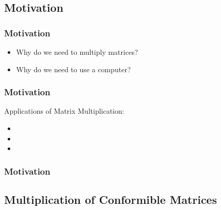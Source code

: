 \documentclass[fleqn]{beamer} %
\newcommand{\sectionIIsubsectionItitle}{Motivation}
\newcommand{\sectionIIsubsectionIItitle}{Multiplication of Conformible Matrices}
\begin{document}
		\subsection{\sectionIIsubsectionItitle}\label{sectionIIsubsectionI}

			\begin{frame}[label=sectionIIsubsectionI]
				\frametitle{\sectionIIsubsectionItitle}
				\bigskip

				\begin{itemize}

					\item Why do we need to multiply matrices? \vspace{20mm}\\
	
					\item Why do we need to use a computer?
	
	  			\end{itemize}
  
				\btVFill
			\end{frame}

			\begin{frame}[label=sectionIIsubsectionI]
				\frametitle{\sectionIIsubsectionItitle}
				\bigskip

				Applications of Matrix Multiplication:
				\begin{itemize}
					\item

					\item

					\item	
				\end{itemize}

				\btVFill
			\end{frame}	

			\begin{frame}[label=sectionIIsubsectionI]
				\frametitle{\sectionIIsubsectionItitle}
				\bigskip

				
				\btVFill
			\end{frame}

		\subsection{\sectionIIsubsectionIItitle}\label{sectionIIsubsectionII}
\end{document}

